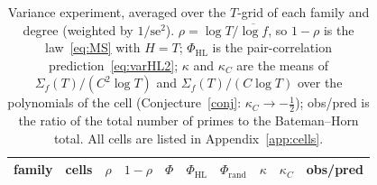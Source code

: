 \documentclass[11pt,a4paper]{article}
\theoremstyle{remark}\newtheorem{remark}[theorem]{Remark}
\begin{document}
\begin{table}[htbp]
\centering\footnotesize\setlength{\tabcolsep}{3pt}
\caption{Variance experiment, averaged over the $T$-grid of each family and degree (weighted by
$1/\mathrm{se}^2$). $\rho=\log T/\overline{\log f}$, so $1-\rho$ is the law~\eqref{eq:MS} with
$H=T$; $\Phi_{\mathrm{HL}}$ is the pair-correlation prediction~\eqref{eq:varHL2}; $\kappa$ and
$\kappa_C$ are the means of $\Sigma_f(T)/(C^2\log T)$ and $\Sigma_f(T)/(C\log T)$ over the polynomials
of the cell (Conjecture~\ref{conj}: $\kappa_C\to-\tfrac12$); obs/pred is the ratio of the total number
of primes to the Bateman--Horn total. All cells are listed in Appendix~\ref{app:cells}.}\label{tab:summary}
\begin{tabular}{lrrrrrrrrr}
\toprule
family & cells & $\rho$ & $1-\rho$ & $\Phi$ & $\Phi_{\mathrm{HL}}$ & $\Phi_{\mathrm{rand}}$ & $\kappa$ & $\kappa_C$ & obs/pred\\
\midrule

\end{tabular}
\end{table}
\end{document}

